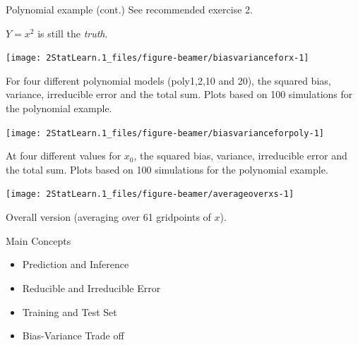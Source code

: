 \documentclass[
  ignorenonframetext,
]{beamer}
\providecommand{\tightlist}{%
  \setlength{\itemsep}{0pt}\setlength{\parskip}{0pt}}
\begin{document}
\begin{frame}
\begin{block}{Polynomial example (cont.)}
\protect\hypertarget{polynomial-example-cont.}{}
See recommended exercise 2.

\vspace{2mm}

\(Y=x^2\) is still the \emph{truth}.

\vspace{2mm}

\begin{center}\texttt{[image: 2StatLearn.1\_files/figure-beamer/biasvarianceforx-1]} \end{center}

For four different polynomial models (poly1,2,10 and 20), the squared
bias, variance, irreducible error and the total sum. Plots based on 100
simulations for the polynomial example.
\end{block}
\end{frame}

\begin{frame}
\begin{center}\texttt{[image: 2StatLearn.1\_files/figure-beamer/biasvarianceforpoly-1]} \end{center}

At four different values for \(x_0\), the squared bias, variance,
irreducible error and the total sum. Plots based on 100 simulations for
the polynomial example.
\end{frame}

\begin{frame}
\begin{center}\texttt{[image: 2StatLearn.1\_files/figure-beamer/averageoverxs-1]} \end{center}

Overall version (averaging over 61 gridpoints of \(x\)).
\end{frame}

\begin{frame}{Main Concepts}
\protect\hypertarget{main-concepts}{}
\begin{itemize}
\tightlist
\item
  Prediction and Inference
\item
  Reducible and Irreducible Error
\item
  Training and Test Set
\item
  Bias-Variance Trade off
\end{itemize}
\end{frame}

\begin{frame}
\end{frame}
\end{document}
